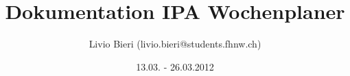 \usepackage[automark]{scrpage2}
\usepackage[english]{babel}
\usepackage[english]{translator}
\usepackage{tocbasic}
\usepackage[utf8]{inputenc}
\usepackage{lmodern}
\usepackage[T1]{fontenc}
\usepackage{hyphenat}
\usepackage{ae}

\usepackage{boxedminipage}
\usepackage[onehalfspacing]{setspace}

\usepackage{minitoc}
\usepackage{longtable}
\usepackage{listings}
\usepackage[printonlyused]{acronym}

\usepackage{booktabs}
\renewcommand{\arraystretch}{1.4}

\usepackage{ifpdf}
\usepackage{eurosym}
\usepackage{natbib}
\usepackage{paralist}
\usepackage{array,ragged2e}
\usepackage{tabularx}

\usepackage[normalem]{ulem} %

\ifpdf
    \usepackage[pdftex]{graphicx}
\else
    \usepackage{graphicx}
\fi

\pagestyle{scrheadings}
\clearscrheadfoot
{}

\lohead{\sffamily\upshape\headmark}
\lofoot{}
\cofoot[\pagemark]{\pagemark}




\title{Dokumentation IPA Wochenplaner}

\author{Livio Bieri (livio.bieri@students.fhnw.ch)}

\date{13.03. - 26.03.2012}



